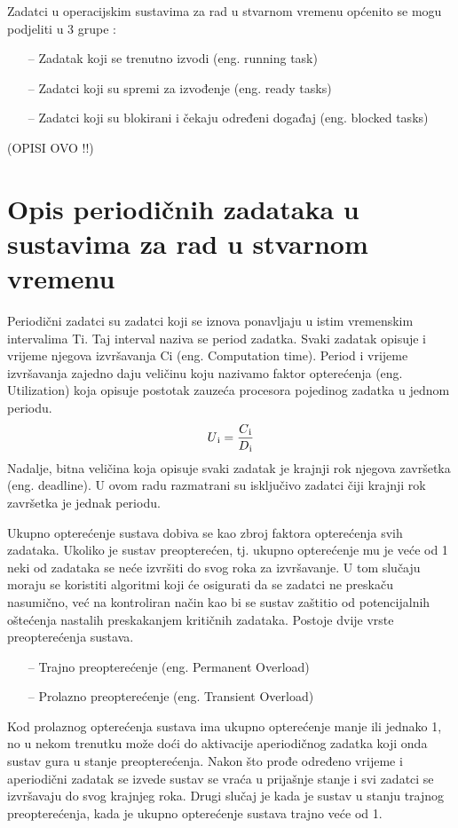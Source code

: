 \documentclass[../zavrsni.tex]{subfiles}
\begin{document}
Zadatci u operacijskim sustavima za rad u stvarnom vremenu općenito se mogu podjeliti u 3 grupe :
\begin{itemize}
    \item[--] Zadatak koji se trenutno izvodi (eng. running task)
    \item[--] Zadatci koji su spremi za izvođenje (eng. ready tasks)
    \item[--] Zadatci koji su blokirani i čekaju određeni događaj (eng. blocked tasks)
\end{itemize}
(OPISI OVO !!)


\section{Opis periodičnih zadataka u sustavima za rad u stvarnom vremenu}

Periodični zadatci su zadatci koji se iznova ponavljaju u istim vremenskim intervalima Ti. Taj interval naziva se period zadatka.
Svaki zadatak opisuje i vrijeme njegova izvršavanja Ci (eng. Computation time). Period i vrijeme izvršavanja zajedno daju veličinu 
koju nazivamo faktor opterećenja (eng. Utilization) koja opisuje postotak zauzeća procesora pojedinog zadatka u jednom periodu.
\begin{equation*}
    U\textsubscript{i} = \frac{C\textsubscript{i}}{D\textsubscript{i}}
\end{equation*}
Nadalje, bitna veličina koja opisuje svaki zadatak je krajnji rok njegova završetka (eng. deadline). U ovom radu razmatrani su 
isključivo zadatci čiji krajnji rok završetka je jednak periodu.

Ukupno opterećenje sustava dobiva se kao zbroj faktora opterećenja svih zadataka. Ukoliko je sustav preopterećen, tj. ukupno opterećenje mu 
je veće od 1 neki od zadataka se neće izvršiti do svog roka za izvršavanje. U tom slučaju moraju se koristiti algoritmi koji će osigurati 
da se zadatci ne preskaču nasumično, već na kontroliran način kao bi se sustav zaštitio od potencijalnih oštećenja nastalih preskakanjem 
kritičnih zadataka. Postoje dvije vrste preopterećenja sustava.
\begin{itemize}
    \item[--] Trajno preopterećenje (eng. Permanent Overload)
    \item[--] Prolazno preopterećenje (eng. Transient Overload)
\end{itemize}
Kod prolaznog opterećenja sustava ima ukupno opterećenje manje ili jednako 1, no u nekom trenutku može doći do aktivacije aperiodičnog zadatka 
koji onda sustav gura u stanje preopterećenja. Nakon što prođe određeno vrijeme i aperiodični zadatak se izvede sustav se vraća u prijašnje
stanje i svi zadatci se izvršavaju do svog krajnjeg roka. Drugi slučaj je kada je sustav u stanju trajnog preopterećenja, kada je ukupno 
opterećenje sustava trajno veće od 1. 
\end{document}
